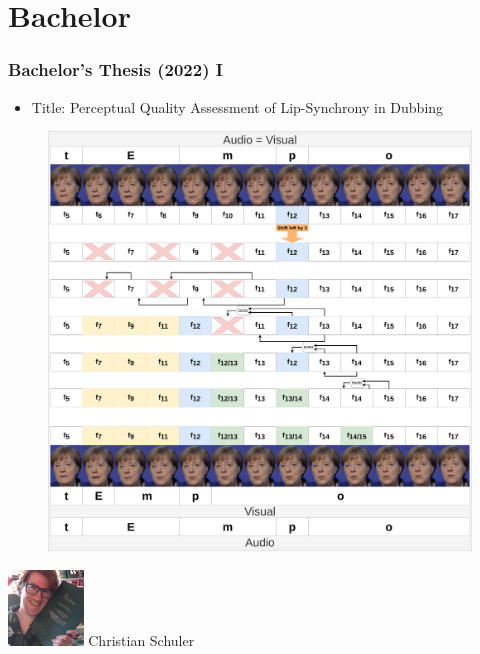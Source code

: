 \documentclass[aspectratio=169]{beamer}
\begin{document}
\section{Bachelor}
\begin{frame}[fragile]
	\frametitle{Bachelor's Thesis (2022) I}
    \begin{itemize}
        \item Title: Perceptual Quality Assessment of Lip-Synchrony in Dubbing
    \end{itemize}
    \begin{minipage}{.5\textwidth}
      \begin{figure}
        \centering
        \includegraphics[width=.9\textwidth]{images/DubbingThesisEditing-vL-merkl.png} 
    \end{figure}
    \end{minipage}%
    \begin{minipage}{.5\textwidth}
    \centering
        \begin{minipage}{.3\textwidth}
            \centering
            \includegraphics[height=2cm]{images/Christian_Schuler_Thesis.jpg} 
            \small{Christian Schuler}
        \end{minipage}%
        \begin{minipage}{.3\textwidth}

\end{minipage}
\end{minipage}
\end{frame}
\end{document}
